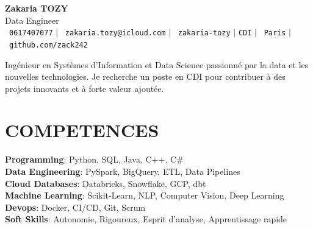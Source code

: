 \documentclass[letterpaper,11pt]{article}
\begin{document}
\begin{center}
    \textbf{\Huge Zakaria TOZY} \\ \vspace{3pt}
    \Large Data Engineer \\ \vspace{5pt}
    \small \faPhone\ \texttt{0617407077} \hspace{1pt} $|$
    \hspace{1pt} \faEnvelope\ \texttt{zakaria.tozy@icloud.com} \hspace{1pt} $|$
    \hspace{1pt} \faLinkedin\ \texttt{zakaria-tozy} \hspace{1pt} $|$
    \hspace{1pt} \texttt{CDI} \hspace{1pt} $|$
    \hspace{1pt} \faMapMarker\ \texttt{Paris} \hspace{1pt} $|$
    \hspace{1pt} \faGithub\ \texttt{github.com/zack242} \\ \vspace{10pt}
\end{center}

\begin{itemize}[leftmargin=0in, label={}]
\small{\item{
Ingénieur en Systèmes d'Information et Data Science passionné par la data et les nouvelles technologies. Je recherche un poste en CDI pour contribuer à des projets innovants et à forte valeur ajoutée.
}}
\end{itemize}

\section{COMPETENCES}
\begin{itemize}[leftmargin=0in, label={}]
\small{\item{
\textbf{Programming}: Python, SQL, Java, C++, C{\#} \\
\vspace{1pt}
\textbf{Data Engineering}: PySpark, BigQuery, ETL, Data Pipelines \\
\vspace{1pt}
\textbf{Cloud Databases}: Databricks, Snowflake, GCP, dbt \\
\vspace{1pt}
\textbf{Machine Learning}: Scikit-Learn, NLP, Computer Vision, Deep Learning \\
\vspace{1pt}
\textbf{Devops}: Docker, CI/CD, Git, Scrum \\
\vspace{1pt}
\textbf{Soft Skills}: Autonomie, Rigoureux, Esprit d'analyse, Apprentissage rapide
}
}
\end{itemize}
\end{document}
